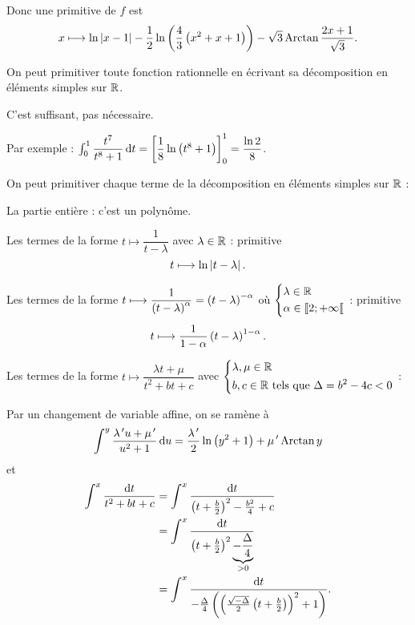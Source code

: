 \begin{ex}
Donc une primitive de \(f\) est \[x\longmapsto\ln\left\lvert x-1\right\rvert-\dfrac{1}{2}\ln\left(\dfrac{4}{3}\left(x^2+x+1\right)\right)-\sqrt{3}\operatorname{Arctan}\dfrac{2x+1}{\sqrt{3}}.\]
\end{ex}

\begin{prop}
On peut primitiver toute fonction rationnelle en écrivant sa décomposition en éléments simples sur \(\mathbb{R}\).
\end{prop}

\begin{rem}
C'est suffisant, pas nécessaire.

Par exemple : \(\int_0^1\dfrac{t^7}{t^8+1}\odif{t}=\croch{\dfrac{1}{8}\ln\paren{t^8+1}}_0^1=\dfrac{\ln2}{8}\).
\end{rem}

\begin{dem}
On peut primitiver chaque terme de la décomposition en éléments simples sur \(\mathbb{R}\) :

La partie entière : c'est un polynôme.

Les termes de la forme \(t\mapsto\dfrac{1}{t-\lambda}\) avec \(\lambda\in\mathbb{R}\) : primitive \[t\longmapsto\ln\left\lvert t-\lambda\right\rvert.\]

Les termes de la forme \(t\longmapsto\dfrac{1}{\left(t-\lambda\right)^{\alpha}}=\left(t-\lambda\right)^{-\alpha}\) où \(\begin{dcases}\lambda\in\mathbb{R} \\ \alpha\in\left\llbracket2;+\infty\right\llbracket\end{dcases}\) : primitive \[t\longmapsto\dfrac{1}{1-\alpha}\left(t-\lambda\right)^{1-\alpha}.\]

Les termes de la forme \(t\mapsto\dfrac{\lambda t+\mu}{t^2+bt+c}\) avec \(\begin{dcases}\lambda,\mu\in\mathbb{R} \\ b,c\in\mathbb{R}\text{ tels que }\Delta=b^2-4c<0\end{dcases}\) :

Par un changement de variable affine, on se ramène à \[\int^y\dfrac{\lambda\prim u+\mu\prim}{u^2+1}\odif{u}=\dfrac{\lambda\prim}{2}\ln\paren{y^2+1}+\mu\prim\Arctan y\] et \[\begin{aligned}
\int^x\dfrac{\odif{t}}{t^2+bt+c}&=\int^x\dfrac{\odif{t}}{\paren{t+\frac{b}{2}}^2-\frac{b^2}{4}+c} \\
&=\int^x\dfrac{\odif{t}}{\paren{t+\frac{b}{2}}^2\underbrace{-\frac{\Delta}{4}}_{>0}} \\
&=\int^x\dfrac{\odif{t}}{-\frac{\Delta}{4}\paren{\paren{\frac{\sqrt{-\Delta}}{2}\paren{t+\frac{b}{2}}}^2+1}}.
\end{aligned}\]


\end{dem}
